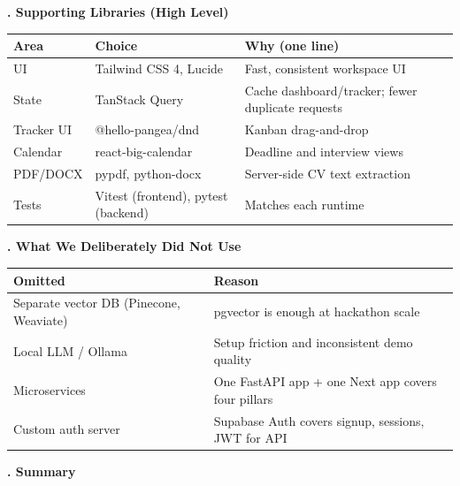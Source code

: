 \documentclass[11pt,a4paper]{article}
\newcommand{\sectiontitle}[1]{%
  \vspace{0.9em}%
  \noindent
  \colorbox{sectiontitlebg}{%
    \parbox{\dimexpr\linewidth-2\fboxsep}{%
      \vspace{6pt}%
      {\fontsize{18}{22}\bfseries\selectfont #1}%
      \vspace{6pt}%
    }%
  }%
  \par\vspace{0.55em}%
}
\begin{document}
\sectiontitle{4. Supporting Libraries (High Level)}

\begin{center}
\small
\begin{tabularx}{\linewidth}{|l|>{\raggedright\arraybackslash}X|>{\raggedright\arraybackslash}X|}
\hline
\textbf{Area} & \textbf{Choice} & \textbf{Why (one line)} \\
\hline
UI & Tailwind CSS 4, Lucide & Fast, consistent workspace UI \\
\hline
State & TanStack Query & Cache dashboard/tracker; fewer duplicate requests \\
\hline
Tracker UI & @hello-pangea/dnd & Kanban drag-and-drop \\
\hline
Calendar & react-big-calendar & Deadline and interview views \\
\hline
PDF/DOCX & pypdf, python-docx & Server-side CV text extraction \\
\hline
Tests & Vitest (frontend), pytest (backend) & Matches each runtime \\
\hline
\end{tabularx}
\end{center}

\sectiontitle{5. What We Deliberately Did Not Use}

\begin{center}
\small
\begin{tabularx}{\linewidth}{|>{\raggedright\arraybackslash}p{4.8cm}|>{\raggedright\arraybackslash}X|}
\hline
\textbf{Omitted} & \textbf{Reason} \\
\hline
Separate vector DB (Pinecone, Weaviate) & pgvector is enough at hackathon scale \\
\hline
Local LLM / Ollama & Setup friction and inconsistent demo quality \\
\hline
Microservices & One FastAPI app + one Next app covers four pillars \\
\hline
Custom auth server & Supabase Auth covers signup, sessions, JWT for API \\
\hline
\end{tabularx}
\end{center}

\sectiontitle{6. Summary}
\end{document}
